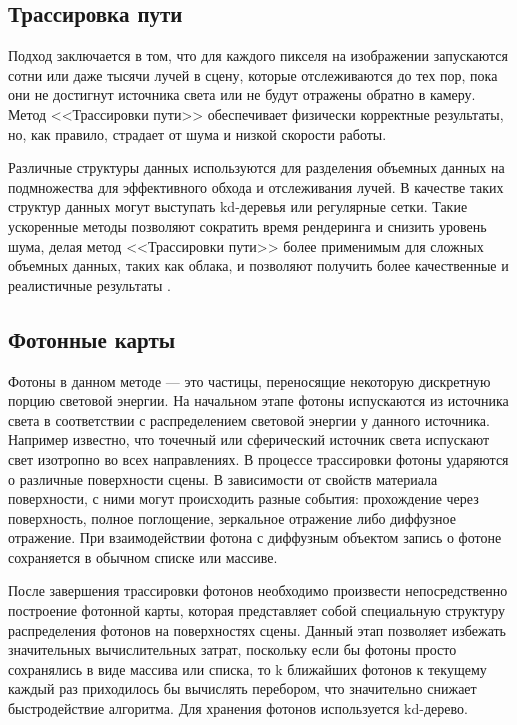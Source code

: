 {\subsection{Трассировка пути}

Подход заключается в том, что для каждого пикселя на изображении запускаются сотни или даже тысячи лучей в сцену, которые отслеживаются до тех пор, пока они не достигнут источника света или не будут отражены обратно в камеру. Метод <<Трассировки пути>> обеспечивает физически корректные результаты, но, как правило, страдает от шума и низкой скорости работы.

Различные структуры данных используются для разделения объемных данных на подмножества для эффективного обхода и отслеживания лучей. В качестве таких структур данных могут выступать kd-деревья или регулярные сетки. Такие ускоренные методы позволяют сократить время рендеринга и снизить уровень шума, делая метод <<Трассировки пути>> более применимым для сложных объемных данных, таких как облака, и позволяют получить более качественные и реалистичные результаты \cite{clouds}.

\subsection{Фотонные карты}

Фотоны в данном методе — это частицы, переносящие некоторую дискретную порцию световой энергии. На начальном этапе фотоны испускаются из источника света в соответствии с распределением световой энергии у данного источника. Например известно, что точечный или сферический источник света испускают свет изотропно во всех направлениях. В  процессе  трассировки  фотоны  ударяются  о  различные  поверхности  сцены.  В 
зависимости от свойств материала поверхности, с ними могут происходить разные события: 
прохождение через поверхность, полное поглощение, зеркальное отражение либо диффузное отражение. При  взаимодействии  фотона  с  диффузным  объектом  запись  о  фотоне 
сохраняется в обычном списке или массиве. 

После  завершения  трассировки  фотонов  необходимо  произвести  непосредственно 
построение  фотонной  карты,  которая  представляет  собой  специальную  структуру 
распределения  фотонов  на  поверхностях  сцены.  Данный  этап  позволяет  избежать 
значительных вычислительных затрат, поскольку если бы фотоны просто сохранялись в виде 
массива  или  списка,  то  k  ближайших  фотонов  к  текущему  каждый  раз  приходилось  бы 
вычислять перебором, что значительно снижает быстродействие алгоритма. Для хранения фотонов используется kd-дерево.

}
